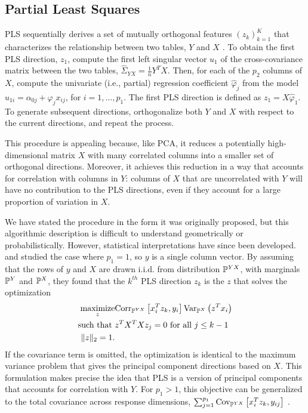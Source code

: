 \documentclass{article}
\begin{document}
\subsection{Partial Least Squares}
\label{subsec:PLS}

PLS sequentially derives a set of mutually orthogonal features
$\left(z_{k}\right)_{k = 1}^{K}$ that characterizes the relationship between two
tables, $Y$ and $X$ \citep{wold1985partial}. To obtain the first PLS direction,
$z_{1}$, compute the first left singular vector $u_{1}$ of the cross-covariance
matrix between the two tables, $\hat{\Sigma}_{YX} = \frac{1}{n}Y^{T}X$. Then,
for each of the $p_{2}$ columns of $X$, compute the univariate (i.e., partial)
regression coefficient $\hat{\varphi}_{j}$ from the model $u_{1i} = \alpha_{0j}
+ \varphi_{j}x_{ij}$, for $i = 1, \dots, p_{1}$. The first PLS direction is
defined as $z_{1} = X\hat{\varphi}_{1}$. To generate subsequent directions,
orthogonalize both $Y$ and $X$ with respect to the current directions, and
repeat the process.

This procedure is appealing because, like PCA, it reduces a potentially
high-dimensional matrix $X$ with many correlated columns into a
smaller set of orthogonal directions. Moreover, it achieves this
reduction in a way that accounts for correlation with columns in
$Y$: columns of $X$ that are uncorrelated with $Y$
will have no contribution to the PLS directions, even if they account
for a large proportion of variation in $X$.

We have stated the procedure in the form it was originally proposed, but this
algorithmic description is difficult to understand geometrically or
probabilistically. However, statistical interpretations have since been
developed. \cite{frank1993statistical} and \cite{stone1990continuum} studied the
case where $p_{1} = 1$, so $y$ is a single column vector. By assuming that the
rows of $y$ and $X$ are drawn i.i.d. from distribution $\P^{YX}$, with marginals
$\P^{Y}$ and $\P^{X}$, they found that the $k^{th}$ PLS direction $z_{k}$ is the
$z$ that solves the optimization
\begin{align}
  \label{eq:pls_obj}
\maximize_{z} & \Corrsubarg{\P^{YX}}{x_{i}^{T}z_{k},
y_{i}}\Varsubarg{\P^{X}}{z^{T}x_i} \\
\text{such that }&z^{T}X^{T}X z_{j} = 0 \text{ for all }j \nonumber
\leq k - 1 \nonumber \\
\|z\|_2 = 1. \nonumber
\end{align}
If the covariance term is omitted, the optimization is identical to the maximum
variance problem that gives the principal component directions based on $X$.
This formulation makes precise the idea that PLS is a version of principal
components that accounts for correlation with $Y$. For $p_1 > 1$, this objective
can be generalized to the total covariance across response dimensions, $\sum_{j
  = 1}^{p_1} \Covsubarg{\P^{YX}}{x_i^T z_k, y_{ij}}$
\citep{chun2010sparse}.
\end{document}
